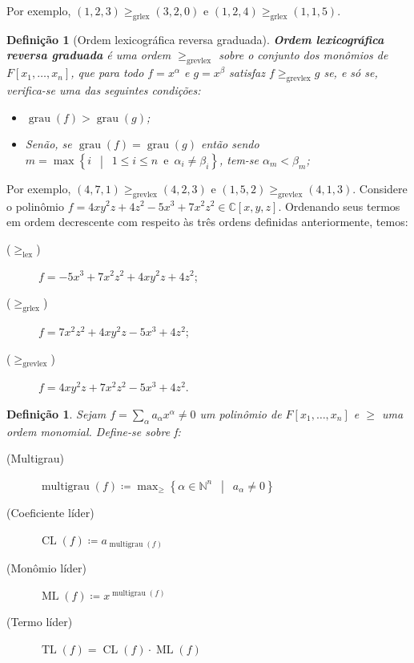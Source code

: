 \documentclass[12pt,a4paper]{report}
\newcommand{\N}{\mathbb{N}}
\newcommand{\C}{\mathbb{C}}
\newcommand{\suchthat}{\enspace\middle|\enspace}
\newtheorem{definition}[theorem]{Definição}
\numberwithin{theorem}{chapter}
\DeclareMathOperator{\grau}{grau}
\DeclareMathOperator{\multigrau}{multigrau}
\DeclareMathOperator{\CL}{CL}
\DeclareMathOperator{\ML}{ML}
\DeclareMathOperator{\TL}{TL}
\begin{document}
Por exemplo, \((1,2,3) \geq_{\text{grlex}} (3,2,0)\) e \((1,2,4)
\geq_{\text{grlex}} (1,1,5)\).

\begin{definition}[Ordem lexicográfica reversa graduada]
  \textbf{Ordem lexicográfica reversa graduada} é uma ordem
  \(\geq_{\text{grevlex}}\) sobre o conjunto dos monômios de
  \(F[x_1,\ldots,x_n]\), que para todo \(f = x^\alpha\) e \(g =
  x^\beta\) satisfaz \(f \geq_{\text{grevlex}} g\) se, e só se,
  verifica-se uma das seguintes condições:

  \begin{itemize}
  \item \(\grau(f) > \grau(g)\);
  \item Senão, se \(\grau(f) = \grau(g)\) então sendo \(m =
    \max\left\{i \suchthat 1 \leq i \leq n \enspace\text{e}\enspace
      \alpha_i \neq \beta_i\right\}\), tem-se \(\alpha_m < \beta_m\);
  \end{itemize}
\end{definition}

Por exemplo, \((4,7,1) \geq_{\text{grevlex}} (4,2,3)\) e \((1,5,2)
\geq_{\text{grevlex}} (4,1,3)\).  Considere o polinômio
\(f=4xy^2z+4z^2-5x^3+7x^2z^2 \in \C[x,y,z]\).  Ordenando seus termos
em ordem decrescente com respeito às três ordens definidas
anteriormente, temos:

\begin{description}
\item[(\(\geq_{\text{lex}}\))] \(f=-5x^3+7x^2z^2+4xy^2z+4z^2\);
\item[(\(\geq_{\text{grlex}}\))] \(f=7x^2z^2+4xy^2z-5x^3+4z^2\);
\item[(\(\geq_{\text{grevlex}}\))] \(f=4xy^2z+7x^2z^2-5x^3+4z^2\).
\end{description}

\begin{definition}
  Sejam \(f = \sum\limits_{\alpha} a_{\alpha}x^\alpha \neq 0\) um
  polinômio de \(F[x_1,\ldots,x_n]\) e \(\geq\) uma ordem monomial.
  Define-se sobre f:

  \begin{description}
  \item[(Multigrau)] \(\multigrau(f) \coloneqq \max_{\geq}\left\{\alpha
      \in \N^n \suchthat a_\alpha \neq 0 \right\}\)

  \item[(Coeficiente líder)] \(\CL(f) \coloneqq a_{\multigrau(f)}\)

  \item[(Monômio líder)] \(\ML(f) \coloneqq x^{\multigrau(f)}\)

  \item[(Termo líder)] \(\TL(f) = \CL(f) \cdot \ML(f)\)
  \end{description}
\end{definition}
\end{document}

